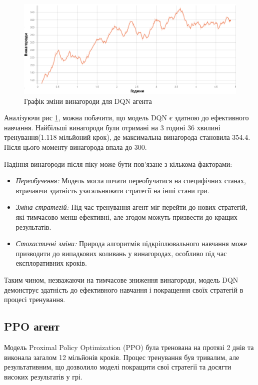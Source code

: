 \begin{figure}[H]
    \centering
    \includegraphics[scale = 0.65]{Pictures/DQN_REWARD.png}
    \caption{Графік зміни винагороди для DQN агента}
    \label{fig:DQN_REWARD}
\end{figure}

Аналізуючи рис \ref{fig:DQN_REWARD}, можна побачити, що модель DQN є 
здатною до ефективного навчання. Найбільші винагороди були отримані на 3 годині 
36 хвилині тренування(1.118 мільйоний крок), де максимальна винагорода становила 
354.4. Після цього моменту винагорода впала до 300.

Падіння винагороди після піку може бути пов'язане з кількома факторами:
\begin{itemize}
    \item \emph{Переобучення:} Модель могла почати переобучатися на специфічних станах, втрачаючи здатність узагальнювати стратегії на інші стани гри.
    \item \emph{Зміна стратегій:} Під час тренування агент міг перейти до нових стратегій, які тимчасово менш ефективні, але згодом можуть призвести до кращих результатів.
    \item \emph{Стохастичні зміни:} Природа алгоритмів підкріплювального навчання може призводити до випадкових коливань у винагородах, особливо під час експлоративних кроків.
\end{itemize}

Таким чином, незважаючи на тимчасове зниження винагороди, модель DQN демонструє 
здатність до ефективного навчання і покращення своїх стратегій в процесі тренування.
\subsection{PPO агент}
Модель Proximal Policy Optimization (PPO) була тренована на протязі 2 днів та виконала загалом 12 мільйонів кроків. 
Процес тренування був тривалим, але результативним, що дозволило моделі покращити свої стратегії та досягти високих результатів у грі.

